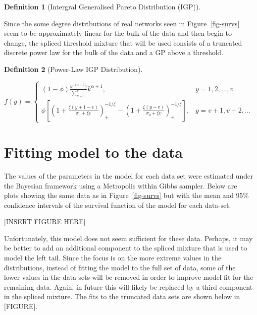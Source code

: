 \documentclass[
  10pt,
  a4paper,
]{scrreprt}
\theoremstyle{plain}
\theoremstyle{definition}
\newtheorem{definition}{Definition}[section]
\theoremstyle{remark}
\begin{document}
{\begin{definition}[Intergral Generalised Pareto Distribution
(IGP)]
\end{definition}

Since the some degree distributions of real networks seen in
Figure~\ref{fig-survs} seem to be approximately linear for the bulk of
the data and then begin to change, the spliced threshold mixture that
will be used consists of a truncated discrete power law for the bulk of
the data and a GP above a threshold.

\begin{definition}[Power-Law IGP
Distribution]\protect\hypertarget{def-pligp}{}\label{def-pligp}

\[
f(y) = \begin{cases}
(1-\phi)\displaystyle\frac{y^{-(\alpha+1})}{\sum_{k=1}^v}k^{\alpha+1}, & y=1,2,\ldots, v\\
\phi\left[\left(1+\displaystyle\frac{\xi(y+1-v)}{\sigma_0+\xi v}\right)_+^{-1/\xi}-\left(1+\displaystyle\frac{\xi(y-v)}{\sigma_0+\xi v}\right)_+^{-1/\xi}\right],&y=v+1, v+2,\ldots
\end{cases}
\]

\end{definition}

\hypertarget{fitting-model-to-the-data}{%
\section{Fitting model to the data}\label{fitting-model-to-the-data}}

The values of the parameters in the model for each data set were
estimated under the Bayesian framework using a Metropolis within Gibbs
sampler. Below are plots showing the same data as in
Figure~\ref{fig-survs} but with the mean and 95\% confidence intervals
of the survival function of the model for each data-set.

{[}INSERT FIGURE HERE{]}

Unfortunately, this model does not seem sufficient for these data.
Perhaps, it may be better to add an additional component to the spliced
mixture that is used to model the left tail. Since the focus is on the
more extreme values in the distributions, instead of fitting the model
to the full set of data, some of the lower values in the data sets will
be removed in order to improve model fit for the remaining data. Again,
in future this will likely be replaced by a third component in the
spliced mixture. The fits to the truncated data sets are shown below in
{[}FIGURE{]}.

\begin{figure}[H]


\end{figure}}
\end{document}
